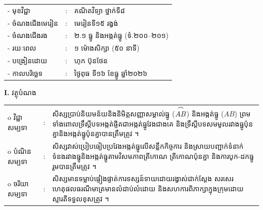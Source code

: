 \documentclass[a4paper,10pt]{article}
\newcommand{\wcirc}{{\CourierBullet\fontsize{9.5pt}{11pt}\selectfont o}}
\newcommand{\arc}[1]{\ensuremath{\overset{\tikz[baseline=-0.55ex]\draw[black, line width=0.55pt] (0,0) to[bend left=40] (1.8ex,0);}{#1}}}
\begin{document}
{\renewcommand{\arraystretch}{0.95}
\hspace*{4.05cm}%
\begin{tabular}{@{}l l l@{}}
  - \hspace{0.35cm} មុខវិជ្ជា & : & គណិតវិទ្យា ថ្នាក់ទី៨ \\
  - \hspace{0.35cm} ចំណងជើងមេរៀន & : & មេរៀនទី១៥ រង្វង់ \\
  - \hspace{0.35cm} ចំណងជើងរង & : & ២.១ ធ្នូ និងអង្កត់ធ្នូ (ទំ.២០០--២០១) \\
  - \hspace{0.35cm} រយៈពេល & : & ១ ម៉ោងសិក្សា (៥០ នាទី) \\
  - \hspace{0.35cm} បង្រៀនដោយ & : & ហុក ប៊ុនថែន \\
  - \hspace{0.35cm} កាលបរិច្ឆេទ & : & ថ្ងៃពុធ ទី១៦ ខែធ្នូ ឆ្នាំ២០២៦ \\
\end{tabular}

\vspace{1pt}

\textbf{I.} {\muol វត្ថុបំណង}\\[1pt]
\hspace*{0.55cm}%
\begin{tabular}{@{}l l L{14.2cm}@{}}
  \wcirc \hspace{0.25cm} វិជ្ជាសម្បទា & : & សិស្សប្រាប់និយមន័យនិងនិមិត្តសញ្ញាសម្គាល់ធ្នូ ($\arc{AB}$) និងអង្កត់ធ្នូ ($AB$) ព្រមទាំងពោលទ្រឹស្ដីបទអង្កត់ផ្ចិតជាអង្កត់ធ្នូវែងជាងគេ និងទ្រឹស្ដីបទសមមូលរវាងធ្នូប៉ុនគ្នានិងអង្កត់ធ្នូប៉ុនគ្នាបានត្រឹមត្រូវ ។ \\
  \wcirc \hspace{0.25cm} បំណិនសម្បទា & : & សិស្សវាស់ប្រៀបធៀបប្រវែងអង្កត់ធ្នូលើសន្លឹកកិច្ចការ និងស្រាយបញ្ជាក់ទំនាក់ទំនងរវាងធ្នូនិងអង្កត់ធ្នូតាមវិសមភាពត្រីកោណ ត្រីកោណប៉ុនគ្នា និងការបូក-ដកធ្នូរួមបានត្រឹមត្រូវ ។ \\
  \wcirc \hspace{0.25cm} ចរិយាសម្បទា & : & សិស្សមានទម្លាប់ផ្ទៀងផ្ទាត់ការទស្សន៍ទាយដោយរង្វាស់ជាក់ស្ដែង សរសេរហេតុផលធរណីមាត្រមានលំដាប់លំដោយ និងសហការពិភាក្សាក្នុងក្រុមដោយស្មារតីទទួលខុសត្រូវ ។ \\
\end{tabular}

\vspace{1pt}

}
\end{document}
